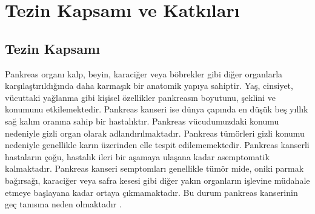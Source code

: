 \section{Tezin Kapsamı ve Katkıları}

\subsection{Tezin Kapsamı}

Pankreas organı kalp, beyin, karaciğer veya böbrekler gibi diğer organlarla karşılaştırıldığında daha karmaşık bir anatomik yapıya sahiptir. Yaş, cinsiyet, vücuttaki yağlanma gibi kişisel özellikler pankreasın boyutunu, şeklini ve konumunu etkilemektedir. Pankreas kanseri ise dünya çapında en düşük beş yıllık sağ kalım oranına sahip bir hastalıktır. Pankreas vücudumuzdaki konumu nedeniyle gizli organ olarak adlandırılmaktadır. Pankreas tümörleri gizli konumu nedeniyle genellikle karın üzerinden elle tespit edilememektedir. Pankreas kanserli hastaların çoğu, hastalık ileri bir aşamaya ulaşana kadar asemptomatik kalmaktadır. Pankreas kanseri semptomları genellikle tümör mide, oniki parmak bağırsağı, karaciğer veya safra kesesi gibi diğer yakın organların işlevine müdahale etmeye başlayana kadar ortaya çıkmamaktadır. Bu durum pankreas kanserinin geç tanısına neden olmaktadır \cite{kamisawa2016pancreatic,mizrahi2020pancreatic}. 

